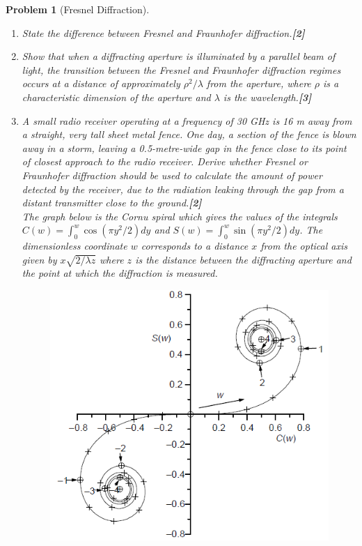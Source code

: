 \documentclass[a4paper]{article}
\theoremstyle{new}
\newtheorem{qns}{Problem}[subsection]
\begin{document}
\begin{qns}[Fresnel Diffraction]\leavevmode
\begin{enumerate}[label=(\roman*)]
\item State the difference between Fresnel and Fraunhofer diffraction.\hfill\textbf{[2]}
\item Show that when a diffracting aperture is illuminated by a parallel beam of light, the transition between the Fresnel and Fraunhofer diffraction regimes occurs at a distance of approximately $\rho^2/\lambda$ from the aperture, where $\rho$ is a characteristic dimension of the aperture and $\lambda$ is the wavelength.\hfill\textbf{[3]}
\item A small radio receiver operating at a frequency of 30 GHz is 16 m away from a straight, very tall sheet metal fence. One day, a section of the fence is blown away in a storm, leaving a 0.5-metre-wide gap in the fence close to its point of closest approach to the radio receiver. Derive whether Fresnel or Fraunhofer diffraction should be used to calculate the amount of power detected by the receiver, due to the radiation leaking through the gap from a distant transmitter close to the ground.\hfill\textbf{[2]}\\[5pt]
The graph below is the Cornu spiral which gives the values of the integrals $C(w) =\int_0^w\cos(\pi y^2/2) dy$ and $S (w) =\int_0^w\sin(\pi y^2/2) dy$. The dimensionless coordinate $w$ corresponds to a distance $x$ from the optical axis given by $x\sqrt{2/\lambda z}$ where $z$ is the distance between the diffracting aperture and the point at which the diffraction is measured.
\begin{figure}[H]
    \centering
    \includegraphics[scale=0.75]{2010P1B9Q.PNG}

\end{figure}
\end{enumerate}
\end{qns}
\end{document}
